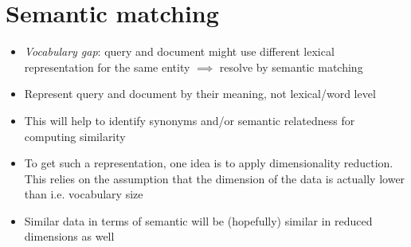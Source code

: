 \section{Semantic matching}
\begin{itemize}
	\item \textit{Vocabulary gap}: query and document might use different lexical representation for the same entity $\implies$ resolve by semantic matching
	\item Represent query and document by their meaning, not lexical/word level
	\item This will help to identify synonyms and/or semantic relatedness for computing similarity
	\item To get such a representation, one idea is to apply dimensionality reduction. This relies on the assumption that the dimension of the data is actually lower than i.e. vocabulary size
	\item Similar data in terms of semantic will be (hopefully) similar in reduced dimensions as well
\end{itemize}
